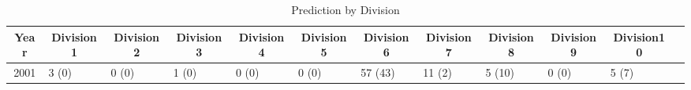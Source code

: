 \documentclass[12pt,letterpaper]{article}
\begin{document}
\begin{table}[h!]
	\centering
	\scriptsize
	\caption{Prediction by Division}
	\begin{threeparttable}
		\begin{tabular}{clllllllllll}
			\toprule
			Year  & \multicolumn{1}{c}{Division1} & \multicolumn{1}{c}{Division2} & \multicolumn{1}{c}{Division3} & \multicolumn{1}{c}{Division4} & \multicolumn{1}{c}{Division5} & \multicolumn{1}{c}{Division6} & \multicolumn{1}{c}{Division7} & \multicolumn{1}{c}{Division8} & \multicolumn{1}{c}{Division9} & \multicolumn{1}{c}{Division10} \\
			\midrule
			2001  & 3\tnote{1} (0)\tnote{2} & 0 (0) & 1 (0) & 0 (0) & 0 (0) & 57 (43) & 11 (2) & 5 (10) & 0 (0) & 5 (7) \\

\end{tabular}
\end{threeparttable}
\end{table}
\end{document}
